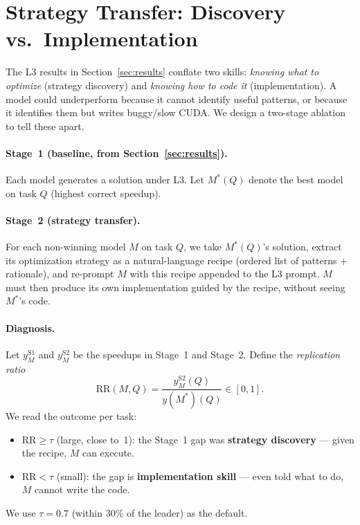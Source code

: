 \documentclass{article}
\begin{document}
\section{Strategy Transfer: Discovery vs.\ Implementation}
\label{sec:transfer}

The L3 results in Section~\ref{sec:results} conflate two skills:
\emph{knowing what to optimize} (strategy discovery) and
\emph{knowing how to code it} (implementation). A model could
underperform because it cannot identify useful patterns, or because
it identifies them but writes buggy/slow CUDA. We design a two-stage
ablation to tell these apart.

\paragraph{Stage~1 (baseline, from Section~\ref{sec:results}).}
Each model generates a solution under L3. Let $M^{*}(Q)$ denote the
best model on task $Q$ (highest correct speedup).

\paragraph{Stage~2 (strategy transfer).}
For each non-winning model $M$ on task $Q$, we take $M^{*}(Q)$'s
solution, extract its optimization strategy as a natural-language
recipe (ordered list of patterns + rationale), and re-prompt $M$ with
this recipe appended to the L3 prompt. $M$ must then produce its own
implementation guided by the recipe, without seeing $M^{*}$'s code.

\paragraph{Diagnosis.} Let $y^{\mathrm{S1}}_{M}$ and
$y^{\mathrm{S2}}_{M}$ be the speedups in Stage~1 and Stage~2. Define
the \emph{replication ratio}
\begin{equation}
\mathrm{RR}(M, Q) = \frac{y^{\mathrm{S2}}_{M}(Q)}{y(M^*)(Q)}
  \in [0, 1].
\label{eq:rr}
\end{equation}
We read the outcome per task:
\begin{itemize}
  \item $\mathrm{RR} \geq \tau$ (large, close to~1): the Stage~1 gap
        was \textbf{strategy discovery} --- given the recipe, $M$
        can execute.
  \item $\mathrm{RR} < \tau$ (small): the gap is \textbf{implementation
        skill} --- even told what to do, $M$ cannot write the code.
\end{itemize}
We use $\tau = 0.7$ (within $30\%$ of the leader) as the default.
\end{document}
